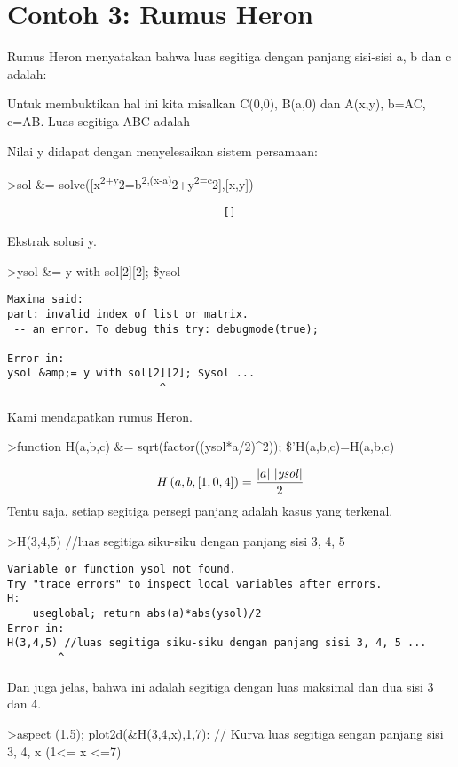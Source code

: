 \documentclass[
]{book}
\begin{document}
\chapter{Contoh 3: Rumus Heron}\label{contoh-3-rumus-heron}

Rumus Heron menyatakan bahwa luas segitiga dengan panjang sisi-sisi a, b dan c adalah:

Untuk membuktikan hal ini kita misalkan C(0,0), B(a,0) dan A(x,y), b=AC, c=AB. Luas segitiga ABC adalah

Nilai y didapat dengan menyelesaikan sistem persamaan:

\textgreater sol \&= solve({[}x\textsuperscript{2+y}2=b\textsuperscript{2,(x-a)}2+y\textsuperscript{2=c}2{]},{[}x,y{]})

\begin{verbatim}
                                  []
\end{verbatim}

Ekstrak solusi y.

\textgreater ysol \&= y with sol{[}2{]}{[}2{]}; \$ysol

\begin{verbatim}
Maxima said:
part: invalid index of list or matrix.
 -- an error. To debug this try: debugmode(true);

Error in:
ysol &amp;= y with sol[2][2]; $ysol ...
                        ^
\end{verbatim}

Kami mendapatkan rumus Heron.

\textgreater function H(a,b,c) \&= sqrt(factor((ysol*a/2)\^{}2)); \$'H(a,b,c)=H(a,b,c)

\[H\left(a , b , \left[ 1 , 0 , 4 \right] \right)=\frac{\left| a \right| \,\left| {\it ysol}\right| }{2}\]Tentu saja, setiap segitiga persegi panjang adalah kasus yang terkenal.

\textgreater H(3,4,5) //luas segitiga siku-siku dengan panjang sisi 3, 4, 5

\begin{verbatim}
Variable or function ysol not found.
Try "trace errors" to inspect local variables after errors.
H:
    useglobal; return abs(a)*abs(ysol)/2 
Error in:
H(3,4,5) //luas segitiga siku-siku dengan panjang sisi 3, 4, 5 ...
        ^
\end{verbatim}

Dan juga jelas, bahwa ini adalah segitiga dengan luas maksimal dan dua sisi 3 dan 4.

\textgreater aspect (1.5); plot2d(\&H(3,4,x),1,7): // Kurva luas segitiga sengan panjang sisi 3, 4, x (1\textless= x \textless=7)
\end{document}
